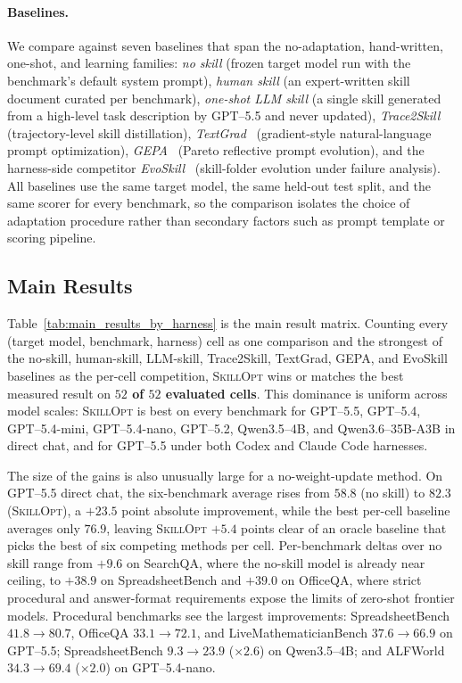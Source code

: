 \documentclass{llmxive}
\providecommand{\ourmethod}{\textsc{SkillOpt}\xspace}
\begin{document}
\paragraph{Baselines.}
We compare against seven baselines that span the no-adaptation, hand-written, one-shot, and learning families: \emph{no skill} (frozen target model run with the benchmark's default system prompt), \emph{human skill} (an expert-written skill document curated per benchmark), \emph{one-shot LLM skill} (a single skill generated from a high-level task description by GPT--5.5 and never updated), \emph{Trace2Skill}~\citep{ni2026trace2skill} (trajectory-level skill distillation), \emph{TextGrad}~\citep{yuksekgonul2024textgrad} (gradient-style natural-language prompt optimization), \emph{GEPA}~\citep{agrawal2025gepa} (Pareto reflective prompt evolution), and the harness-side competitor \emph{EvoSkill}~\citep{alzubi2026evoskill} (skill-folder evolution under failure analysis). All baselines use the same target model, the same held-out test split, and the same scorer for every benchmark, so the comparison isolates the choice of adaptation procedure rather than secondary factors such as prompt template or scoring pipeline.

\subsection{Main Results}
\label{sec:main_results}

Table~\ref{tab:main_results_by_harness} is the main result matrix. Counting every (target model, benchmark, harness) cell as one comparison and the strongest of the no-skill, human-skill, LLM-skill, Trace2Skill, TextGrad, GEPA, and EvoSkill baselines as the per-cell competition, \ourmethod{} wins or matches the best measured result on \textbf{$52$ of $52$ evaluated cells}. This dominance is uniform across model scales: \ourmethod{} is best on every benchmark for GPT--5.5, GPT--5.4, GPT--5.4-mini, GPT--5.4-nano, GPT--5.2, Qwen3.5--4B, and Qwen3.6--35B-A3B in direct chat, and for GPT--5.5 under both Codex and Claude Code harnesses.

The size of the gains is also unusually large for a no-weight-update method. On GPT--5.5 direct chat, the six-benchmark average rises from $58.8$ (no skill) to $82.3$ (\ourmethod{}), a $+23.5$ point absolute improvement, while the best per-cell baseline averages only $76.9$, leaving \ourmethod{} $+5.4$ points clear of an oracle baseline that picks the best of six competing methods per cell. Per-benchmark deltas over no skill range from $+9.6$ on SearchQA, where the no-skill model is already near ceiling, to $+38.9$ on SpreadsheetBench and $+39.0$ on OfficeQA, where strict procedural and answer-format requirements expose the limits of zero-shot frontier models. Procedural benchmarks see the largest improvements: SpreadsheetBench $41.8{\to}80.7$, OfficeQA $33.1{\to}72.1$, and LiveMathematicianBench $37.6{\to}66.9$ on GPT--5.5; SpreadsheetBench $9.3{\to}23.9$ ($\times 2.6$) on Qwen3.5--4B; and ALFWorld $34.3{\to}69.4$ ($\times 2.0$) on GPT--5.4-nano.
\end{document}
